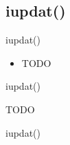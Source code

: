 \documentclass{beamer}
\begin{document}
\subsection{iupdat()}

\begin{frame}{iupdat()}
    \begin{itemize}
        \item TODO
    \end{itemize}
\end{frame}

\begin{frame}{iupdat()}
    \begin{algorithmic}[1]
        \State TODO
    \end{algorithmic}
\end{frame}

\begin{frame}{iupdat()}
\end{frame}
\end{document}
